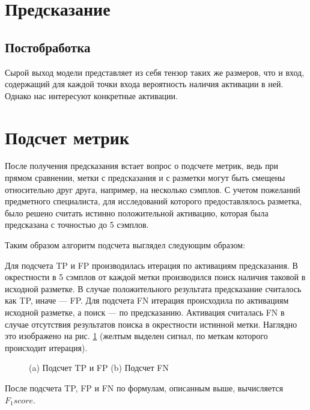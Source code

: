 \section{Предсказание}

\subsection{Постобработка}
Сырой выход модели представляет из себя тензор таких же размеров, что и вход,
содержащий для каждой точки входа вероятность наличия активации в ней. Однако
нас интересуют конкретные активации.

\section{Подсчет метрик}

После получения предсказания встает вопрос о подсчете метрик, ведь при прямом
сравнении, метки с предсказания и с разметки могут быть смещены относительно
друг друга, например, на несколько сэмплов. С учетом пожеланий предметного
специалиста, для исследований которого предоставлялось разметка, было решено
считать истинно положительной активацию, которая была предсказана с точностью
до 5 сэмплов.

Таким образом алгоритм подсчета выглядел следующим образом:

Для подсчета TP и FP производилась итерация по активациям предсказания. В
окрестности в 5 сэмплов от каждой метки производился поиск наличия таковой в
исходной разметке. В случае положительного результата предсказание считалось
как TP, иначе --- FP. Для подсчета FN итерация происходила по активациям исходной
разметке, а поиск --- по предсказанию. Активация считалась FN в случае
отсутствия результатов поиска в окрестности истинной метки. Наглядно это
изображено на рис. \ref{fig:metrics} (желтым выделен сигнал, по меткам которого
происходит итерация).

\begin{figure}[!htb]
	\centering
	\caption{(a) Подсчет TP и FP (b) Подсчет FN}
	\label{fig:metrics}
\end{figure}

После подсчета TP, FP и FN по формулам, описанным выше, вычисляется $F_1score$.
